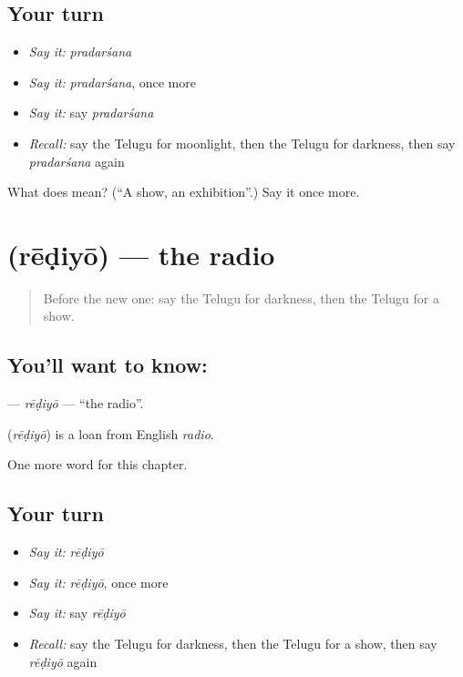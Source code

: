 \subsection*{Your turn}
\begin{itemize}
\raggedright
  \item \emph{Say it:} \emph{pradarśana}
  \item \emph{Say it:} \emph{pradarśana}, once more
  \item \emph{Say it:} say \emph{pradarśana}
  \item \emph{Recall:} say the Telugu for moonlight, then the Telugu for darkness, then say \emph{pradarśana} again
\end{itemize}

\begin{tcolorbox}[breakable,colback=teal!4,colframe=teal!35!black,title={Before you move on}]
What does  mean? (\textquotedblleft{}A show, an exhibition\textquotedblright{}.) Say it once more.
\end{tcolorbox}
\section[\texorpdfstring{\te{రేడియో} (rēḍiyō)}{రేడియో (rēḍiyō)}]{ (rēḍiyō) — the radio}

\label{lesson:TE-C268-rediyo}



\begin{quote}
Before the new one: say the Telugu for darkness, then the Telugu for a show.
\end{quote}

\subsection*{You'll want to know: }
\textbf{} — \emph{rēḍiyō} — \textquotedblleft{}the radio\textquotedblright{}.

\begin{cousinweb}
\textbf{} (\emph{rēḍiyō}) is a loan from English \emph{radio}.
\end{cousinweb}

\begin{grammarlens}[title={What you've built}]
One more word for this chapter.
\end{grammarlens}

\subsection*{Your turn}
\begin{itemize}
\raggedright
  \item \emph{Say it:} \emph{rēḍiyō}
  \item \emph{Say it:} \emph{rēḍiyō}, once more
  \item \emph{Say it:} say \emph{rēḍiyō}
  \item \emph{Recall:} say the Telugu for darkness, then the Telugu for a show, then say \emph{rēḍiyō} again
\end{itemize}

